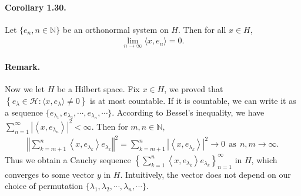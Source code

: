 \documentclass{article}
\begin{document}
\paragraph{Corollary 1.30.\label{cor:1.30}} Let $\{e_n,n\in\mathbb{N}\}$ be an orthonormal system on $H$. Then for all $x\in H$,
\begin{align*}
	\lim_{n\to\infty}\langle x,e_n\rangle = 0.
\end{align*}

\paragraph{Remark.} Now we let $H$ be a Hilbert space. Fix $x\in H$, we proved that $\left\{e_\lambda\in\mathscr{H}:\langle x,e_\lambda\rangle\neq 0\right\}$ is at most countable. If it is countable, we can write it as a sequence $\{e_{\lambda_1},e_{\lambda_2},\cdots,e_{\lambda_n},\cdots\}$. According to Bessel's inequality, we have $\sum_{n=1}^\infty\left\vert\left\langle x,e_{\lambda_n}\right\rangle\right\vert^2 < \infty$. Then for $m,n\in\mathbb{N}$,
\begin{align*}
	\left\Vert\sum_{k=m+1}^n\left\langle x,e_{\lambda_k}\right\rangle e_{\lambda_k}\right\Vert^2 = \sum_{k=m+1}^n\left\vert\left\langle x,e_{\lambda_k}\right\rangle\right\vert^2\to 0\ \ \text{as}\ \ n,m\to\infty.
\end{align*}
Thus we obtain a Cauchy sequence $\left\{\sum_{k=1}^n\left\langle x,e_{\lambda_k}\right\rangle e_{\lambda_k}\right\}_{n=1}^\infty$ in $H$, which converges to some vector $y$ in $H$. Intuitively, the vector does not depend on our choice of permutation $\{\lambda_1,\lambda_2,\cdots,\lambda_n,\cdots\}$.
\end{document}

